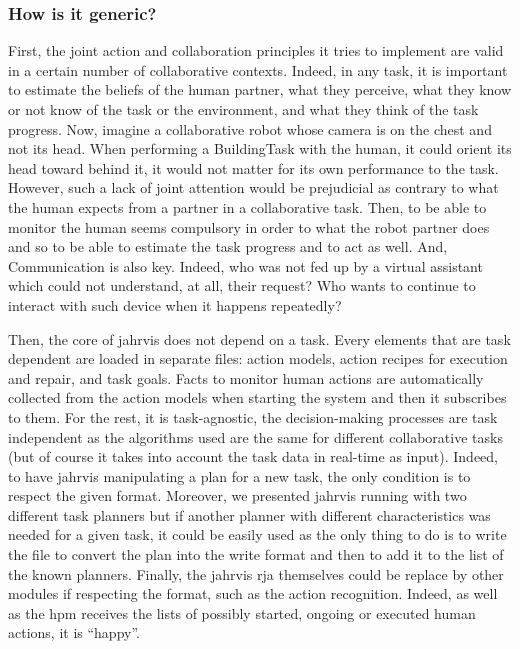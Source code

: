 \documentclass[a4paper,11pt,twoside]{StyleThese}
\begin{document}
\subsubsection*{How is it generic?}
First, the joint action and collaboration principles it tries to implement are valid in a certain number of collaborative contexts. Indeed, in any task, it is important to estimate the beliefs of the human partner, \ie what they perceive, what they know or not know of the task or the environment, and what they think of the task progress. Now, imagine a collaborative robot whose camera is on the chest and not its head. When performing a BuildingTask with the human, it could orient its head toward behind it, it would not matter for its own performance to the task. However, such a lack of joint attention would be prejudicial as contrary to what the human expects from a partner in a collaborative task. Then, to be able to monitor the human seems compulsory in order to what the robot partner does and so to be able to estimate the task progress and to act as well. And, Communication is also key. Indeed, who was not fed up by a virtual assistant which could not understand, at all, their request? Who wants to continue to interact with such device when it happens repeatedly? 

Then, the core of \acrshort{jahrvis} does not depend on a task. Every elements that are task dependent are loaded in separate files: action models, action recipes for execution and repair, and task goals. Facts to monitor human actions are automatically collected from the action models when starting the system and then it subscribes to them. For the rest, it is task-agnostic, the decision-making processes are task independent as the algorithms used are the same for different collaborative tasks (but of course it takes into account the task data in real-time as input). Indeed, to have \acrshort{jahrvis} manipulating a plan for a new task, the only condition is to respect the given format. Moreover, we presented \acrshort{jahrvis} running with two different task planners but if another planner with different characteristics was needed for a given task, it could be easily used as the only thing to do is to write the file to convert the plan into the write format and then to add it to the list of the known planners. Finally, the \acrshort{jahrvis} \acrshort{rja} themselves could be replace by other modules if respecting the format, such as the action recognition. Indeed, as well as the \acrlong{hpm} receives the lists of possibly started, ongoing or executed human actions, it is ``happy''.
\end{document}
